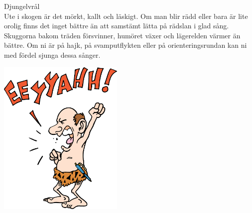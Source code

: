 \begin{flushleft}
{\Huge Djungelvrål\\}
{\Large
\vspace{1cm}
Ute i skogen är det mörkt, kallt och läskigt. Om man blir rädd eller
bara är lite orolig finns det inget bättre än att samstämt lätta på
rädslan i glad sång. Skuggorna bakom träden försvinner, humöret växer
och lägerelden värmer än bättre. Om ni är på hajk, på svamputflykten eller på
orienteringsrundan kan ni med fördel sjunga dessa sånger.}
   
\end{flushleft}
\vspace{2cm}
\begin{center}
\includegraphics[width=6cm]{bilder/120.eps}

\end{center}
 


